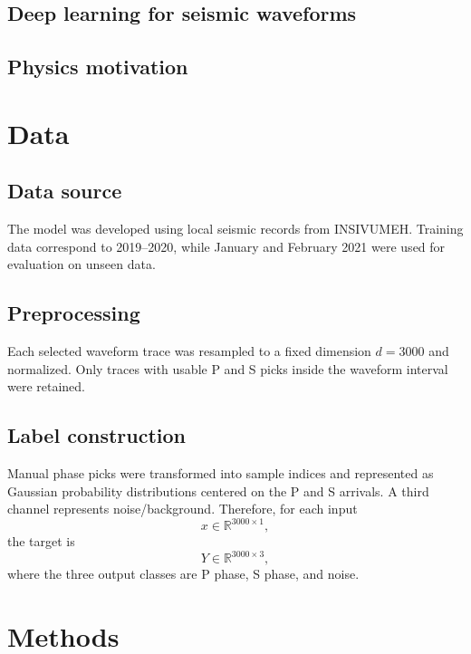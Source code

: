 \documentclass[11pt]{article}
\begin{document}
\subsection{Deep learning for seismic waveforms}

\subsection{Physics motivation}

\section{Data}
\subsection{Data source}
The model was developed using local seismic records from INSIVUMEH. Training data correspond to 2019--2020, while January and February 2021 were used for evaluation on unseen data.

\subsection{Preprocessing}
Each selected waveform trace was resampled to a fixed dimension $d=3000$ and normalized. Only traces with usable P and S picks inside the waveform interval were retained.

\subsection{Label construction}
Manual phase picks were transformed into sample indices and represented as Gaussian probability distributions centered on the P and S arrivals. A third channel represents noise/background. Therefore, for each input
\begin{equation}
    x \in \mathbb{R}^{3000 \times 1},
\end{equation}
the target is
\begin{equation}
    Y \in \mathbb{R}^{3000 \times 3},
\end{equation}
where the three output classes are P phase, S phase, and noise.

\section{Methods}
\end{document}
